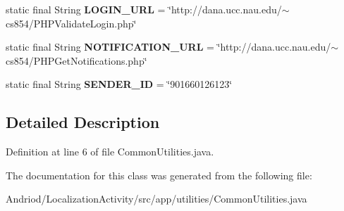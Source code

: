 \begin{DoxyCompactItemize}
\item 
\hypertarget{classapp_1_1utilities_1_1_common_utilities_aae938c8d9e111d3af2c1d40f3c60d035}{static final String {\bfseries L\-O\-G\-I\-N\-\_\-\-U\-R\-L} = \char`\"{}http\-://dana.\-ucc.\-nau.\-edu/$\sim$cs854/P\-H\-P\-Validate\-Login.\-php\char`\"{}}\label{classapp_1_1utilities_1_1_common_utilities_aae938c8d9e111d3af2c1d40f3c60d035}

\item 
\hypertarget{classapp_1_1utilities_1_1_common_utilities_aa7348a7cdf118cb735f588a0f6b26a91}{static final String {\bfseries N\-O\-T\-I\-F\-I\-C\-A\-T\-I\-O\-N\-\_\-\-U\-R\-L} = \char`\"{}http\-://dana.\-ucc.\-nau.\-edu/$\sim$cs854/P\-H\-P\-Get\-Notifications.\-php\char`\"{}}\label{classapp_1_1utilities_1_1_common_utilities_aa7348a7cdf118cb735f588a0f6b26a91}

\item 
\hypertarget{classapp_1_1utilities_1_1_common_utilities_aa840ce9801840253f450d1ef532a119b}{static final String {\bfseries S\-E\-N\-D\-E\-R\-\_\-\-I\-D} = \char`\"{}901660126123\char`\"{}}\label{classapp_1_1utilities_1_1_common_utilities_aa840ce9801840253f450d1ef532a119b}

\end{DoxyCompactItemize}


\subsection{Detailed Description}


Definition at line 6 of file Common\-Utilities.\-java.



The documentation for this class was generated from the following file\-:\begin{DoxyCompactItemize}
\item 
Andriod/\-Localization\-Activity/src/app/utilities/Common\-Utilities.\-java\end{DoxyCompactItemize}
